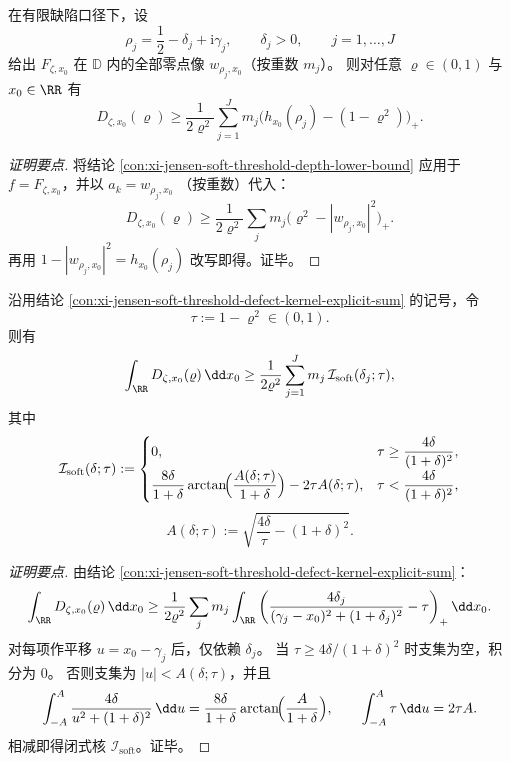 \begin{conclusion}\label{con:xi-jensen-soft-threshold-defect-kernel-explicit-sum}
在有限缺陷口径下，设
\[
\rho_j=\frac12-\delta_j+\mathrm{i}\gamma_j,\qquad
\delta_j>0,\qquad
j=1,\dots,J
\]
给出 \(F_{\zeta,x_0}\) 在 \(\mathbb D\) 内的全部零点像 \(w_{\rho_j,x_0}\)（按重数 \(m_j\)）。
则对任意 \(\varrho\in(0,1)\) 与 \(x_0\in\RR\) 有
\[
D_{\zeta,x_0}(\varrho)
\ge
\frac1{2\varrho^2}\sum_{j=1}^J
m_j\bigl(h_{x_0}(\rho_j)-(1-\varrho^2)\bigr)_+.
\]
\end{conclusion}
\begin{proof}[证明要点]
将结论 \ref{con:xi-jensen-soft-threshold-depth-lower-bound} 应用于 \(f=F_{\zeta,x_0}\)，并以
\(
a_k=w_{\rho_j,x_0}
\)
（按重数）代入：
\[
D_{\zeta,x_0}(\varrho)\ge
\frac1{2\varrho^2}\sum_j m_j\bigl(\varrho^2-|w_{\rho_j,x_0}|^2\bigr)_+.
\]
再用
\(
1-|w_{\rho_j,x_0}|^2=h_{x_0}(\rho_j)
\)
改写即得。证毕。
\end{proof}

\begin{conclusion}\label{con:xi-jensen-soft-threshold-integrated-arctan-closed-lower-bound}
沿用结论 \ref{con:xi-jensen-soft-threshold-defect-kernel-explicit-sum} 的记号，令
\[
\tau:=1-\varrho^2\in(0,1).
\]
则有
\[
\int_{\RR}D_{\zeta,x_0}(\varrho)\,\dd x_0
\ge
\frac1{2\varrho^2}\sum_{j=1}^{J}m_j\,\mathcal I_{\mathrm{soft}}(\delta_j;\tau),
\]
其中
\[
\mathcal I_{\mathrm{soft}}(\delta;\tau):=
\begin{cases}
0, & \tau\ge \dfrac{4\delta}{(1+\delta)^2},\\[2mm]
\dfrac{8\delta}{1+\delta}\arctan\!\Bigl(\dfrac{A(\delta;\tau)}{1+\delta}\Bigr)-2\tau A(\delta;\tau),
& \tau<\dfrac{4\delta}{(1+\delta)^2},
\end{cases}
\]
\[
A(\delta;\tau):=\sqrt{\frac{4\delta}{\tau}-(1+\delta)^2}.
\]
\end{conclusion}
\begin{proof}[证明要点]
由结论 \ref{con:xi-jensen-soft-threshold-defect-kernel-explicit-sum}：
\[
\int_{\RR}D_{\zeta,x_0}(\varrho)\,\dd x_0
\ge
\frac1{2\varrho^2}\sum_j m_j
\int_{\RR}\left(\frac{4\delta_j}{(\gamma_j-x_0)^2+(1+\delta_j)^2}-\tau\right)_+\dd x_0.
\]
对每项作平移 \(u=x_0-\gamma_j\) 后，仅依赖 \(\delta_j\)。
当 \(\tau\ge4\delta/(1+\delta)^2\) 时支集为空，积分为 \(0\)。
否则支集为 \(|u|<A(\delta;\tau)\)，并且
\[
\int_{-A}^{A}\frac{4\delta}{u^2+(1+\delta)^2}\,\dd u
=\frac{8\delta}{1+\delta}\arctan\!\Bigl(\frac{A}{1+\delta}\Bigr),\qquad
\int_{-A}^{A}\tau\,\dd u=2\tau A.
\]
相减即得闭式核 \(\mathcal I_{\mathrm{soft}}\)。证毕。
\end{proof}

